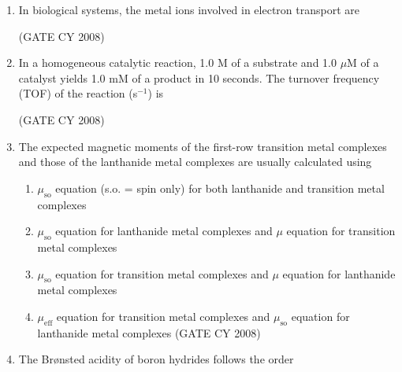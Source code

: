 \documentclass[12pt]{article}
\begin{document}
\begin{enumerate}
\item In biological systems, the metal ions involved in electron transport are
\begin{enumerate}
 \hfill{(GATE CY 2008)}
\end{enumerate}

\item In a homogeneous catalytic reaction, 1.0 M of a substrate and 1.0 $\mu$M of a catalyst yields 1.0 mM of a product in 10 seconds. The turnover frequency (TOF) of the reaction (s$^{-1}$) is
\begin{enumerate}
   \hfill{(GATE CY 2008)}
\end{enumerate}


\item The expected magnetic moments of the first-row transition metal complexes and those of the lanthanide metal complexes are usually calculated using
\begin{enumerate}
\item  $\mu_{\text{so}}$ equation (s.o. = spin only) for both lanthanide and transition metal complexes
\item  $\mu_{\text{so}}$ equation for lanthanide metal complexes and $\mu$ equation for transition metal complexes
\item  $\mu_{\text{so}}$ equation for transition metal complexes and $\mu$ equation for lanthanide metal complexes
\item  $\mu_{\text{eff}}$ equation for transition metal complexes and $\mu_{\text{so}}$ equation for lanthanide metal complexes    \hfill{(GATE CY 2008)}
\end{enumerate}




\item The Brønsted acidity of boron hydrides follows the order


\end{enumerate}
\end{document}
